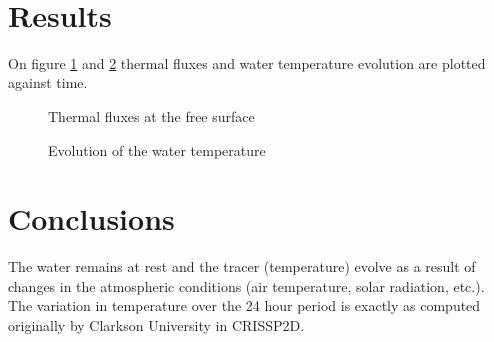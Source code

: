 ~\newline
\section{Results}
On figure \ref{fig:thermal_fluxes} and \ref{fig:thermal_temp} thermal fluxes and water temperature evolution are plotted against time.

\begin{figure}[H]
    \begin{center}
    \end{center}
    \caption{Thermal fluxes at the free surface}
    \label{fig:thermal_fluxes}
\end{figure}


\begin{figure}[H]
    \begin{center}
    \end{center}
    \caption{Evolution of the water temperature}
    \label{fig:thermal_temp}
\end{figure}

\section{Conclusions}

The water remains at rest and the tracer (temperature) evolve as a result of changes in the atmospheric conditions (air temperature, solar radiation, etc.).
The variation in temperature over the 24 hour period is exactly as computed originally by Clarkson University in CRISSP2D.

%
%
%
%
%
%


\renewcommand{\labelitemi}{\textbullet}
